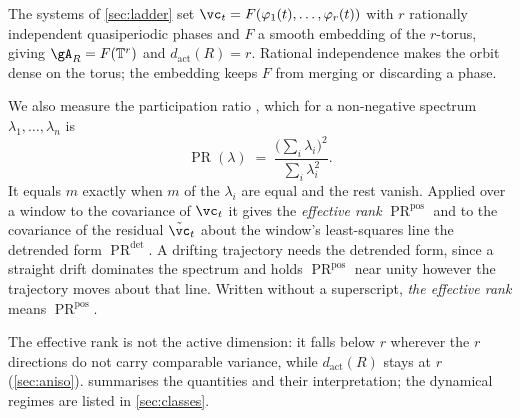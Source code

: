 \documentclass{article}
\DeclareMathOperator{\PR}{PR}
\begin{document}
The systems of \cref{sec:ladder} set $\vc_t = F(\varphi_1(t), \dots, \varphi_r(t))$ with $r$
rationally independent quasiperiodic phases and $F$ a smooth embedding of the $r$-torus, giving
$\gA_R = F(\mathbb{T}^{r})$ and $d_{\mathrm{act}}(R) = r$. Rational independence makes the orbit
dense on the torus; the embedding keeps $F$ from merging or discarding a phase.

We also measure the participation ratio \citep{gao2017theory}, which for a non-negative spectrum
$\lambda_1, \dots, \lambda_n$ is
\begin{equation}\label{eq:pr}
  \PR(\lambda) \;=\; \frac{\bigl(\sum_i \lambda_i\bigr)^2}{\sum_i \lambda_i^2} .
\end{equation}
It equals $m$ exactly when $m$ of the $\lambda_i$ are equal and the rest vanish. Applied over a
window to the covariance of $\vc_t$ it gives the \emph{effective rank} $\PR^{\mathrm{pos}}$ and to
the covariance of the residual $\tilde{\vc}_t$ about the window's least-squares line the detrended
form $\PR^{\mathrm{det}}$. A drifting trajectory needs the detrended
form, since a straight drift dominates the spectrum and holds $\PR^{\mathrm{pos}}$ near unity
however the trajectory moves about that line. Written without a superscript, \emph{the effective
rank} means $\PR^{\mathrm{pos}}$.

The effective rank is not the active dimension: it falls below $r$ wherever the $r$ directions do
not carry comparable variance, while $d_{\mathrm{act}}(R)$ stays at $r$ (\cref{sec:aniso}).
 summarises the quantities and their interpretation; the dynamical
regimes are listed in \cref{sec:classes}.
\end{document}
